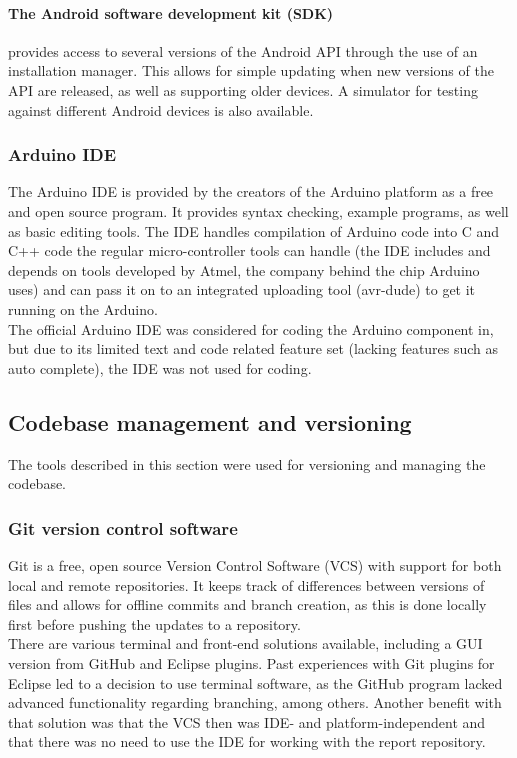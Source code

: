 \paragraph{The Android software development kit (SDK)}
provides access to several versions of the Android API through the use of an installation manager. This allows for simple updating when new versions of the API are released, as well as supporting older devices. A simulator for testing against different Android devices is also available.

\subsubsection{Arduino IDE}
The Arduino IDE is provided by the creators of the Arduino platform as a free and open source program. It provides syntax checking, example programs, as well as basic editing tools. The IDE handles compilation of Arduino code into C and C++ code the regular micro-controller tools can handle (the IDE includes and depends on tools developed by Atmel, the company behind the chip Arduino uses) and can pass it on to an integrated uploading tool (avr-dude) to get it running on the Arduino.\\
\newline
The official Arduino IDE was considered for coding the Arduino component in, but due to its limited text and code related feature set (lacking features such as auto complete), the IDE was not used for coding.

\subsection{Codebase management and versioning}
The tools described in this section were used for versioning and managing the codebase.

\subsubsection{Git version control software}
Git is a free, open source Version Control Software (VCS) with support for both local and remote repositories. It keeps track of differences between versions of files and allows for offline commits and branch creation, as this is done locally first before pushing the updates to a repository.\\
\newline
There are various terminal and front-end solutions available, including a GUI version from GitHub and Eclipse plugins. Past experiences with Git plugins for Eclipse led to a decision to use terminal software, as the GitHub program lacked advanced functionality regarding branching, among others. Another benefit with that solution was that the VCS then was IDE- and platform-independent and that there was no need to use the IDE for working with the report repository.

